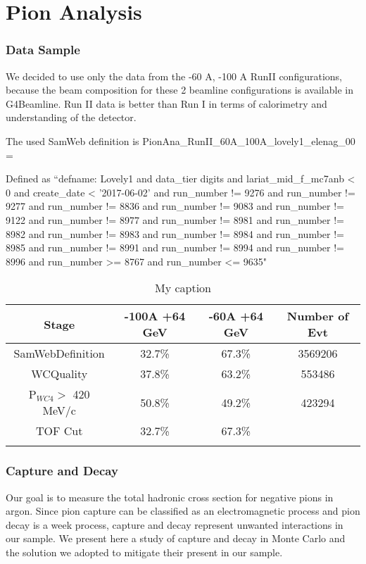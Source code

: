 \chapter{Pion Analysis}

\subsection{Data Sample}

We decided to use only the data from the  -60 A, -100 A RunII configurations, because the beam composition for these 2 beamline configurations is available in G4Beamline. Run II data is better than Run I in terms of calorimetry and understanding of the detector. 

The used SamWeb definition is PionAna\_RunII\_60A\_100A\_lovely1\_elenag\_00  = 

Defined as ``defname: Lovely1 and data\_tier digits and lariat\_mid\_f\_mc7anb < 0 and create\_date < '2017-06-02' and run\_number != 9276 and run\_number != 9277 and run\_number != 8836 and run\_number != 9083 and run\_number != 9122 and run\_number != 8977 and run\_number != 8981 and run\_number != 8982 and run\_number != 8983 and run\_number != 8984 and run\_number != 8985 and run\_number != 8991 and run\_number != 8994 and run\_number != 8996 and run\_number >= 8767 and
run\_number <= 9635"

\begin{table}[]
\centering
\caption{My caption}
\label{my-label}
\begin{tabular}{|c|c|c|c|}
\hline
Stage                                          & -100A +64 GeV & -60A +64 GeV & Number of Evt \\
\hline
SamWebDefinition                     & 32.7\%        & 67.3\% & 3569206      \\
WCQuality                                  & 37.8\%        & 63.2\% &  553486      \\
P$_{WC4} > $ 420 MeV/c               & 50.8\%        & 49.2\% &  423294      \\
TOF Cut                                     & 32.7\%        & 67.3\% &       \\
\hline
                                               &               &             &\\
\hline
\end{tabular}
\end{table}

\subsection{Capture and Decay}
Our goal is to measure the total hadronic cross section for negative pions in argon. Since pion capture can be classified as an electromagnetic process and pion decay is a week process,  capture and decay represent unwanted interactions in our sample. We present here a study of capture and decay in Monte Carlo and the solution we adopted to mitigate their present in our sample. 

